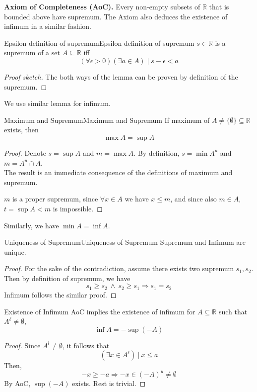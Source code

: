 \textbf{Axiom of Completeness (AoC).} Every non-empty subsets of
$\mathbb{R}$ that is bounded above have supremum. The Axiom also
deduces the existence of infimum in a similar fashion.\\

\begin{defi}{Epsilon definition of supremum}{Epsilon definition
    of supremum}
    $s \in \mathbb{R}$ is a supremum of a set $A \subseteq \mathbb{R}$ iff
    \[ ( \forall  \epsilon > 0) (\exists  a \in A) \mid   s - \epsilon < a\]
    \begin{proof}[Proof sketch] The both ways of the lemma can be
        proven by definition of the supremum.
    \end{proof}
    We use similar lemma for infimum.\\
\end{defi}

\begin{prop}{Maximum and Supremum}{Maximum and Supremum}
    If maximum of $A  \neq \{ \emptyset \} \subseteq \mathbb{R}$
    exists, then
    \[ \max A = \sup A\]
    \begin{proof}
        Denote $s = \sup A$ and $m = \max A$. By definition, $s = \min
        A^u$ and $m = A^u \cap A$. \\
        The result is an immediate consequence of the definitions of
        maximum and supremum.

        \vspace{4mm}
        $m$ is a proper supremum, since $\forall x\in A$ we have $x \le
        m$, and since also $m \in A$, $t = \sup A < m$ is impossible.
    \end{proof}
    Similarly, we have $\min A = \inf A$.
\end{prop}

\begin{prop}{Uniqueness of Supremum}{Uniqueness of Supremum}
    Supremum and Infimum are unique.
    \begin{proof}
        For the sake of the contradiction, assume there exists two
        supremum $s_1, s_2$. Then by definition of supremum, we have
        \[ s_1 \ge s_2 \ \land \ s_2 \ge s_1 \Rightarrow s_1 = s_2\]
        Infimum follows the similar proof.
    \end{proof}
\end{prop}

\begin{prop}{Existence of Infimum}
    AoC implies the existence of infimum for $A \subseteq \mathbb{R}$
    such that $A^{\ell} \neq \emptyset$,
    \[\inf A = -\sup(-A)\]
    \begin{proof}
        Since $A^l \neq \emptyset$, it follows that
        \[(\exists x \in A^{\ell}) \ | \ x \le a\]
        Then,
        \[ -x \ge -a \Rightarrow -x \in (-A)^u \neq \emptyset \]
        By AoC, $\sup(-A)$ exists. Rest is trivial.
    \end{proof}
\end{prop}

